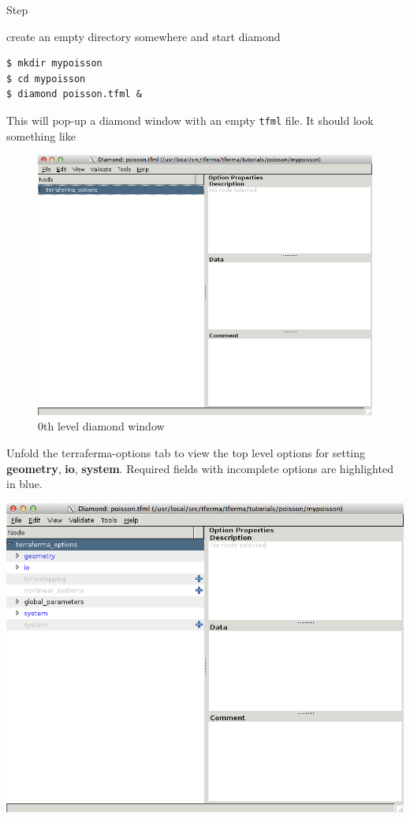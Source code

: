 \begin{steps}{Step}
\item  create an empty directory somewhere and start diamond
\begin{lstlisting}[style=bash]
$ mkdir mypoisson
$ cd mypoisson
$ diamond poisson.tfml & 
\end{lstlisting}%
This will pop-up a
diamond window with an empty \texttt{tfml} file.
It should look something like
\begin{figure}[h]
  \centering
  \includegraphics[width=\diamondwidth]{figures/screendumps/diamond_poisson_00.png}
  \caption{0th level diamond window}
  \label{fig:diamond-poisson-0}
\end{figure}
\pagebreak
\item Unfold the terraferma-options tab to view the top level options
  for setting \textbf{geometry}, \textbf{io}, \textbf{system}.  Required fields with
    incomplete options are highlighted in blue.
\begin{center}
  \includegraphics[width=\diamondwidth]{figures/screendumps/diamond_poisson_01.png}
\end{center}


\end{steps}
